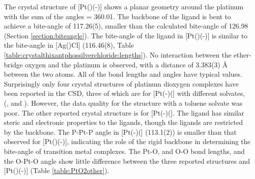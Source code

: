 The crystal structure of [Pt(\tButhixantphos)(-)] shows a planar geometry around the platinum with the sum of the angles = 360.01\degrees{}.  The backbone of the ligand is bent to achieve a bite-angle of 117.26(5)\degrees, smaller than the calculated bite-angle of 126.98\degrees{} (Section \ref{section:biteangle}).  The bite-angle of the \tButhixantphos{} ligand in [Pt(\tButhixantphos)(-)] is similar to the bite-angle in [Ag(\tButhixantphos)Cl] (116.46(8)\degrees, Table \ref{table:crystalthixantphossilverchloride:lengths}).  No interaction between the ether-bridge oxygen and the platinum is observed, with a distance of 3.383(3) \si{\angstrom} between the two atoms.  All of the bond lengths and angles have typical values.  Surprisingly only four crystal structures of platinum dioxygen complexes have been reported in the \gls{CSD}, three of which are for [Pt(-)(] with different solvates, (,  and )\cite{Kashiwagi1969, Cheng1971, Cook1969}.  However, the data quality for the structure with a toluene solvate was poor.\cite{Cook1969}  The other reported crystal structure is for [Pt(-)(]\cite{Yoshida1979}.  The  ligand has similar steric and electronic properties to the \tBuxantphos{} ligands, though the \tBuxantphos{} ligands are restricted by the backbone.  The P-Pt-P angle in [Pt(-)(] (113.1(2)\degrees) is smaller than that observed for [Pt(\tButhixantphos)(-)], indicating the role of the rigid backbone in determining the bite-angle of transition metal complexes.  The Pt-O, and O-O bond lengths, and the O-Pt-O angle show little difference between the three reported structures and [Pt(\tButhixantphos)(-)] (Table \ref{table:PtO2other}).

